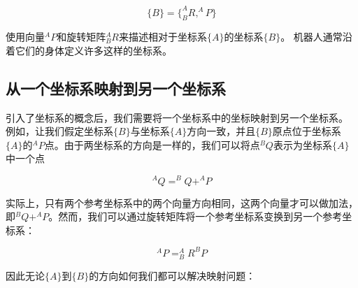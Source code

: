 \begin{equation}
\{B\}=\{^A_BR, ^AP\}
\end{equation}
%

使用向量$^AP$和旋转矩阵$^A_BR$来描述相对于坐标系$\{A\}$的坐标系$\{B\}$。 机器人通常沿着它们的身体定义许多这样的坐标系。

\subsection{从一个坐标系映射到另一个坐标系}


引入了坐标系的概念后，我们需要将一个坐标系中的坐标映射到另一个坐标系。 例如，让我们假定坐标系$\{B\}$与坐标系$\{A\}$方向一致，并且$\{B\}$原点位于坐标系$\{A\}$的$^AP$点。由于两坐标系的方向是一样的，我们可以将点$^BQ$表示为坐标系$ \{A\} $中一个点

%
\begin{equation}
^AQ=^BQ+^AP
\end{equation}
%

实际上，只有两个参考坐标系中的两个向量方向相同，这两个向量才可以做加法，即$ ^BQ + ^AP $。然而，我们可以通过旋转矩阵将一个参考坐标系变换到另一个参考坐标系：

\begin{equation}
^AP=^A_BR^BP
\end{equation}
%

因此无论$\{A\}$到$ \{B\} $的方向如何我们都可以解决映射问题：


